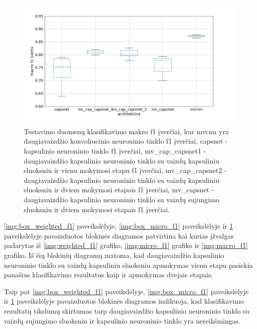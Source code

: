 \begin{figure}[H]
	\centering
	\includegraphics[scale=0.4]{img/boxplot_f1_macro.png}
	\caption{
		Testavimo duomenų klasifikavimo makro f1 įverčiai, kur mvcnn yra daugiavaizdžio konvoliucinio neuroninio tinklo f1 įverčiai, capsnet - kapsulinio neuroninio tinklo f1 įverčiai, mv\_cap\_capsnet1 - daugiavaizdžio kapsulinio neuroninio tinklo su vaizdų kapsuliniu sluoksniu ir vienu mokymosi etapu f1 įverčiai, mv\_cap\_capsnet2 - daugiavaizdžio kapsulinio neuroninio tinklo su vaizdų kapsuliniu sluoksniu ir dviem mokymosi etapais f1 įverčiai,
		mv\_capsnet - daugiavaizdžio kapsulinio neuroninio tinklo su vaizdų sujungimo sluoksniu ir dviem mokymosi etapais f1 įverčiai.
	}
	\label{img:box_macro_f1}
\end{figure}


\ref{img:box_weighted_f1} paveikslėlyje, \ref{img:box_micro_f1} paveikslėlyje ir \ref{img:box_macro_f1} paveikslėlyje pavaizduotos blokinės diagramos patvirtina kai kurias įžvalgas padarytas iš \ref{img:weighted_f1} grafiko, \ref{img:micro_f1} grafiko ir \ref{img:macro_f1} grafiko. Iš šių blokinių diagramų matoma, kad daugiavaizdžio kapsulinio neuroninio tinklo su vaizdų kapsuliniu sluoksniu apmokymas vienu etapu pasiekia panašius klasifikavimo rezultatus kaip ir apmokymas dvejais etapais.

Taip pat \ref{img:box_weighted_f1} paveikslėlyje, \ref{img:box_micro_f1} paveikslėlyje ir \ref{img:box_macro_f1} paveikslėlyje pavaizduotos blokinės diagramos indikuoja, kad klasifikavimo rezultatų tikslumų skirtumas tarp daugiavaizdžio kapsulinio neuroninio tinklo su vaizdų sujungimo sluoksniu ir kapsulinio neuroninio tinklo yra nereikšmingas.
